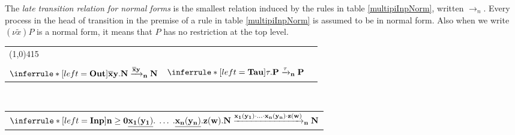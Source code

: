 \begin{definition}
  The \emph{late transition relation for normal forms} is the smallest relation induced by the rules in table \ref{multipiInpNorm}, written $\rightarrow_{n}$. Every process in the head of transition in the premise of a rule in table \ref{multipiInpNorm} is assumed to be in normal form. Also when we write $(\nu \tilde{x})P$ is a normal form, it means that $P$ has no restriction at the top level.
  \begin{table}
    \begin{tabular}{lll}
	\multicolumn{3}{l}{\line(1,0){415}}
	\\\\
	  $\inferrule* [left=\bf{Out}]{
	  }{
	    \overline{x}y.N \xrightarrow{\overline{x}y}_{n} N
	  }$
	&
	  $\inferrule* [left=\bf{Tau}]{
	  }{
	    \tau.P \xrightarrow{\tau}_{n} P
	  }$
      \\
      \end{tabular}
	\\
      \begin{tabular}{l}
      \\
	  $\inferrule* [left=\bf{Inp}]{
	      n \geq 0
	  }{
	    \underline{x_{1}(y_{1})}.\; \ldots\; .\underline{x_{n}(y_{n})}.z(w).N
	      \xrightarrow{x_{1}(y_{1})\cdot \ldots \cdot x_{n}(y_{n})\cdot z(w)}_{n}
		N
	  }$
      \\
      \end{tabular}
	\\
\end{table}
\end{definition}
